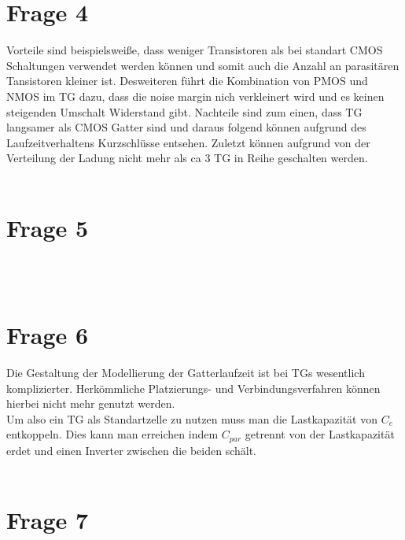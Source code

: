 \documentclass[a4paper]{scrartcl}
\begin{document}
\section*{Frage 4}
Vorteile sind beispielsweiße, dass weniger Transistoren als bei standart CMOS Schaltungen verwendet werden können und somit auch die Anzahl an parasitären Tansistoren kleiner ist. Desweiteren führt die Kombination von PMOS und NMOS im TG dazu, dass die noise margin nich verkleinert wird und es keinen steigenden Umschalt Widerstand gibt.
Nachteile sind zum einen, dass TG langsamer als CMOS Gatter sind und daraus folgend können aufgrund des Laufzeitverhaltens Kurzschlüsse entsehen. Zuletzt können aufgrund von der Verteilung der Ladung nicht mehr als ca 3 TG in Reihe geschalten werden.
~\\
~\\
\section*{Frage 5}

~\\
~\\
\section*{Frage 6}
Die Gestaltung  der Modellierung der Gatterlaufzeit ist bei TGs wesentlich komplizierter. Herkömmliche Platzierungs- und Verbindungsverfahren können hierbei nicht mehr genutzt werden.\\
Um also ein TG als Standartzelle zu nutzen muss man die Lastkapazität von $C_e$ entkoppeln. Dies kann man erreichen indem $C_{par}$ getrennt von der Lastkapazität erdet und einen Inverter zwischen die beiden schält.
~\\
~\\
\section*{Frage 7}

~\\
~\\
\end{document}
